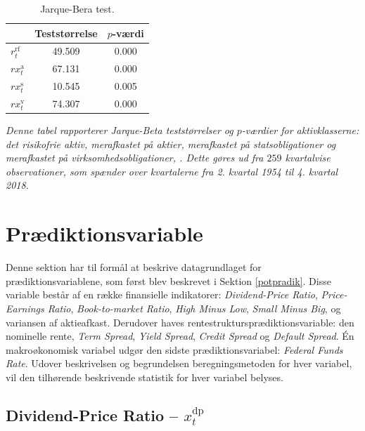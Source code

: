 \documentclass[
  a4paper,
  oneside]{memoir}
\begin{document}
\begin{table}[H]

\caption{\label{tab:JB-AKTIVKLASSE}Jarque-Bera test.}
\centering
\begin{threeparttable}
\begin{tabular}[t]{lcc}
\toprule
  & Teststørrelse & $p$-værdi\\
\midrule
\rowcolor{gray!6}  $r_t^{\text{rf}}$ & 49.509 & 0.000\\
$rx_t^{\text{a}}$ & 67.131 & 0.000\\
\rowcolor{gray!6}  $rx_t^{\text{s}}$ & 10.545 & 0.005\\
$rx_t^{\text{v}}$ & 74.307 & 0.000\\
\bottomrule
\end{tabular}
\begin{tablenotes}
\item \textit{Denne tabel rapporterer Jarque-Beta teststørrelser og $p$-værdier for aktivklasserne: det risikofrie aktiv, merafkastet på aktier, merafkastet på statsobligationer og merafkastet på virksomhedsobligationer, \citep{Jarque1980}. Dette gøres ud fra $259$ kvartalvise observationer, som spænder over kvartalerne fra 2. kvartal 1954 til 4. kvartal 2018.}
\end{tablenotes}
\end{threeparttable}
\end{table}

\hypertarget{pvariable}{%
\section{Prædiktionsvariable}\label{pvariable}}

Denne sektion har til formål at beskrive datagrundlaget for prædiktionsvariablene, som først blev beskrevet i Sektion \ref{potpradik}. Disse variable består af en række finansielle indikatorer: \emph{Dividend-Price Ratio}, \emph{Price-Earnings Ratio}, \emph{Book-to-market Ratio}, \emph{High Minus Low}, \emph{Small Minus Big}, og variansen af aktieafkast. Derudover haves rentestruktursprædiktionsvariable: den nominelle rente, \emph{Term Spread}, \emph{Yield Spread}, \emph{Credit Spread} og \emph{Default Spread}. Én makroøkonomisk variabel udgør den sidste prædiktionsvariabel: \emph{Federal Funds Rate}. Udover beskrivelsen og begrundelsen beregningsmetoden for hver variabel, vil den tilhørende beskrivende statistik for hver variabel belyses.

\hypertarget{dividend-price-ratio-x_ttextdp}{%
\subsection{\texorpdfstring{Dividend-Price Ratio -- \(x_t^{\text{dp}}\)}{Dividend-Price Ratio -- x\_t\^{}\{\textbackslash text\{dp\}\}}}\label{dividend-price-ratio-x_ttextdp}}
\end{document}
